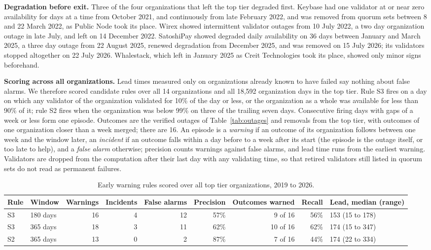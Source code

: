 \documentclass[11pt,a4paper]{article}
\begin{document}
\textbf{Degradation before exit.} Three of the four organizations that left the top tier degraded first. Keybase had one validator at or near zero availability for days at a time from October 2021, and continuously from late February 2022, and was removed from quorum sets between 8 and 22 March 2022, as Public Node took its place. Wirex showed intermittent validator outages from 10 July 2022, a two day organization outage in late July, and left on 14 December 2022. SatoshiPay showed degraded daily availability on 36 days between January and March 2025, a three day outage from 22 August 2025, renewed degradation from December 2025, and was removed on 15 July 2026; its validators stopped altogether on 22 July 2026. Whalestack, which left in January 2025 as Creit Technologies took its place, showed only minor signs beforehand.

\textbf{Scoring across all organizations.} Lead times measured only on organizations already known to have failed say nothing about false alarms. We therefore scored candidate rules over all 14 organizations and all 18,592 organization days in the top tier. Rule S3 fires on a day on which any validator of the organization validated for 10\% of the day or less, or the organization as a whole was available for less than 90\% of it; rule S2 fires when the organization was below 99\% on three of the trailing seven days. Consecutive firing days with gaps of a week or less form one episode. Outcomes are the verified outages of Table~\ref{tab:outages} and removals from the top tier, with outcomes of one organization closer than a week merged; there are 16. An episode is a \emph{warning} if an outcome of its organization follows between one week and the window later, an \emph{incident} if an outcome falls within a day before to a week after its start (the episode is the outage itself, or too late to help), and a \emph{false alarm} otherwise; precision counts warnings against false alarms, and lead time runs from the earliest warning. Validators are dropped from the computation after their last day with any validating time, so that retired validators still listed in quorum sets do not read as permanent failures.

\begin{table}[h]
\centering
\small
\setlength{\tabcolsep}{4pt}
\begin{tabular}{@{}llrrrrrrl@{}}
\toprule
Rule & Window & Warnings & Incidents & False alarms & Precision & Outcomes warned & Recall & Lead, median (range) \\
\midrule
S3 & 180 days & 16 & 4 & 12 & 57\% & 9 of 16 & 56\% & 153 (15 to 178) \\
S3 & 365 days & 18 & 3 & 11 & 62\% & 10 of 16 & 62\% & 174 (15 to 347) \\
S2 & 365 days & 13 & 0 & 2 & 87\% & 7 of 16 & 44\% & 174 (22 to 334) \\
\bottomrule
\end{tabular}
\caption{Early warning rules scored over all top tier organizations, 2019 to 2026.}
\label{tab:score}
\end{table}
\end{document}

